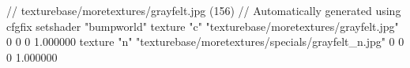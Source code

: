 // texturebase/moretextures/grayfelt.jpg (156)
// Automatically generated using cfgfix
setshader "bumpworld"
texture "c" "texturebase/moretextures/grayfelt.jpg" 0 0 0 1.000000
texture "n" "texturebase/moretextures/specials/grayfelt_n.jpg" 0 0 0 1.000000
